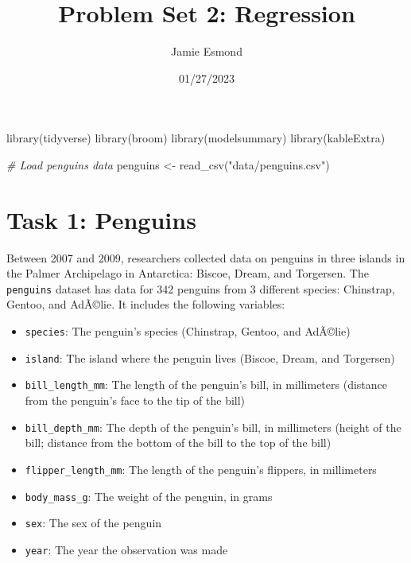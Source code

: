 \documentclass[
]{article}
\title{Problem Set 2: Regression}
\author{Jamie Esmond}
\date{01/27/2023}
\newenvironment{Shaded}{\begin{snugshade}}{\end{snugshade}}
\newcommand{\CommentTok}[1]{\textcolor[rgb]{0.56,0.35,0.01}{\textit{#1}}}
\newcommand{\FunctionTok}[1]{\textcolor[rgb]{0.00,0.00,0.00}{#1}}
\newcommand{\NormalTok}[1]{#1}
\newcommand{\OtherTok}[1]{\textcolor[rgb]{0.56,0.35,0.01}{#1}}
\newcommand{\StringTok}[1]{\textcolor[rgb]{0.31,0.60,0.02}{#1}}
\providecommand{\tightlist}{%
  \setlength{\itemsep}{0pt}\setlength{\parskip}{0pt}}
\begin{document}
\maketitle

{
\setcounter{tocdepth}{2}
\tableofcontents
}
\begin{Shaded}
\begin{Highlighting}[]
\FunctionTok{library}\NormalTok{(tidyverse)}
\FunctionTok{library}\NormalTok{(broom)}
\FunctionTok{library}\NormalTok{(modelsummary)}
\FunctionTok{library}\NormalTok{(kableExtra)}

\CommentTok{\# Load penguins data}
\NormalTok{penguins }\OtherTok{\textless{}{-}} \FunctionTok{read\_csv}\NormalTok{(}\StringTok{"data/penguins.csv"}\NormalTok{)}
\end{Highlighting}
\end{Shaded}

\hypertarget{task-1-penguins}{%
\section{Task 1: Penguins}\label{task-1-penguins}}

Between 2007 and 2009, researchers collected data on penguins in three
islands in the Palmer Archipelago in Antarctica: Biscoe, Dream, and
Torgersen. The \texttt{penguins} dataset has data for 342 penguins from
3 different species: Chinstrap, Gentoo, and AdÃ©lie. It includes the
following variables:

\begin{itemize}
\tightlist
\item
  \texttt{species}: The penguin's species (Chinstrap, Gentoo, and
  AdÃ©lie)
\item
  \texttt{island}: The island where the penguin lives (Biscoe, Dream,
  and Torgersen)
\item
  \texttt{bill\_length\_mm}: The length of the penguin's bill, in
  millimeters (distance from the penguin's face to the tip of the bill)
\item
  \texttt{bill\_depth\_mm}: The depth of the penguin's bill, in
  millimeters (height of the bill; distance from the bottom of the bill
  to the top of the bill)
\item
  \texttt{flipper\_length\_mm}: The length of the penguin's flippers, in
  millimeters
\item
  \texttt{body\_mass\_g}: The weight of the penguin, in grams
\item
  \texttt{sex}: The sex of the penguin
\item
  \texttt{year}: The year the observation was made
\end{itemize}
\end{document}
